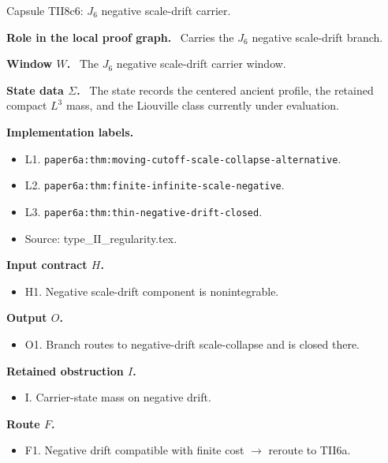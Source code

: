 \documentclass[11pt]{amsart}
\newcommand{\capsulefield}[1]{\par\smallskip\noindent\textbf{#1.}\ }
\begin{document}
\begin{proofcapsule}{Capsule TII8c6: $J_6$ negative scale-drift carrier.}
  \capsulefield{Role in the local proof graph}
  Carries the \(J_6\) negative scale-drift branch.

  \capsulefield{Window \(W\)}
The $J_6$ negative scale-drift carrier window.

  \capsulefield{State data \(\Sigma\)}
The state records the centered ancient profile, the retained compact $L^3$ mass, and the Liouville class currently under evaluation.

  \capsulefield{Implementation labels}
  \begin{itemize}[leftmargin=1.8em]
  \item L1. \texttt{paper6a:thm:moving-cutoff-scale-collapse-alternative}.
  \item L2. \texttt{paper6a:thm:finite-infinite-scale-negative}.
  \item L3. \texttt{paper6a:thm:thin-negative-drift-closed}.
  \item Source: type\_II\_regularity.tex.
  \end{itemize}

  \capsulefield{Input contract \(H\)}
  \begin{itemize}[leftmargin=1.8em]
  \item H1. Negative scale-drift component is nonintegrable.
  \end{itemize}

  \capsulefield{Output \(O\)}
  \begin{itemize}[leftmargin=1.8em]
  \item O1. Branch routes to negative-drift scale-collapse and is closed there.
  \end{itemize}

  \capsulefield{Retained obstruction \(I\)}
  \begin{itemize}[leftmargin=1.8em]
  \item I. Carrier-state mass on negative drift.
  \end{itemize}

  \capsulefield{Route \(F\)}
  \begin{itemize}[leftmargin=1.8em]
  \item F1. Negative drift compatible with finite cost $\to$ reroute to TII6a.
  \end{itemize}


\end{proofcapsule}
\end{document}
